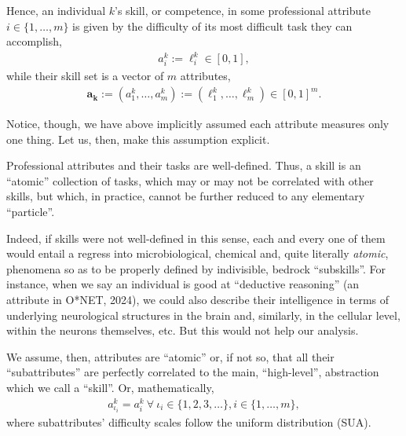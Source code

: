 \documentclass[hidelinks, nonatbib]{elsarticle}
\begin{document}
\begin{definition}[Skill]
    \label{def_skill}
    Hence, an individual $k$'s skill, or competence, in some professional attribute $i \in \{1, \dots, m\}$ is given by the difficulty of its most difficult task they can accomplish,
    \begin{gather}
        a_{i}^{k}
        :=
        \ell_{i}^{k}
        \in
        [0,1]
        ,
    \end{gather}
    while their skill set is a vector of $m$ attributes,
    \begin{gather}
        \boldsymbol{a_k}
        :=
        (
            a_{1}^{k}
            ,
            \dots
            ,
            a_{m}^{k}
        )
        :=
        (
            \ell_{1}^{k}
            ,
            \dots
            ,
            \ell_{m}^{k}
        )
        \in
        [0,1] ^ m
        .
    \end{gather}
\end{definition}

Notice, though, we have above implicitly assumed each attribute measures only one thing. Let us, then, make this assumption explicit.
\begin{axiom}
    \label{aaa}
    Professional attributes and their tasks are well-defined. Thus, a skill is an ``atomic'' collection of tasks, which may or may not be correlated with other skills, but which, in practice, cannot be further reduced to any elementary ``particle''.
    
    Indeed, if skills were not well-defined in this sense, each and every one of them would entail a regress into microbiological, chemical and, quite literally \textit{atomic}, phenomena so as to be properly defined by indivisible, bedrock ``subskills''. For instance, when we say an individual is good at ``deductive reasoning'' (an attribute in O*NET, 2024), we could also describe their intelligence in terms of underlying neurological structures in the brain and, similarly, in the cellular level, within the neurons themselves, etc. But this would not help our analysis.

    We assume, then, attributes are ``atomic'' or, if not so, that all their ``subattributes'' are perfectly correlated to the main, ``high-level'', abstraction which we call a ``skill''. Or, mathematically,
    \begin{gather}
        a_{\iota_i}^{k}
        =
        a_{i}^{k}
        \
        \forall
        \
        \iota_i
        \in 
        \{1, 2, 3, \dots\},
        i \in \{1, \dots, m\}
        ,
    \end{gather}
    where subattributes' difficulty scales follow the uniform distribution (SUA).
\end{axiom}
\end{document}

